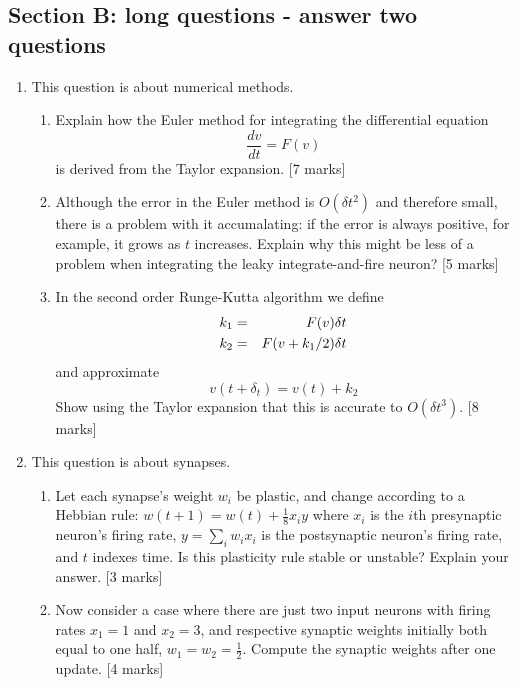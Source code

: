\documentclass[a4paper,12pt]{article}
\newif\ifsoln
\begin{document}
\subsection*{Section B: long questions - answer two questions}

\begin{enumerate}


\item This question is about numerical methods. 
\begin{enumerate}
\item Explain how the Euler method for integrating the differential equation 
$$\frac{dv}{dt}=F(v)$$
is derived from the Taylor expansion. [7 marks]
\item Although the error in the Euler method is $O(\delta t^2)$ and
  therefore small, there is a problem with it accumalating: if the
  error is always positive, for example, it grows as $t$
  increases. Explain why this might be less of a problem when
  integrating the leaky integrate-and-fire neuron? [5 marks]
\item In the second order Runge-Kutta algorithm we define
\begin{eqnarray*}
k_1&=&F(v)\delta t\cr
k_2&=&F(v+k_1/2)\delta t
\end{eqnarray*}
and approximate
$$
v(t+\delta_t)=v(t)+k_2
$$
Show using the Taylor expansion that this is accurate to $O(\delta t^3)$. [8 marks]
\end{enumerate}

\ifsoln Solution:  a) and c) see notes; b) because of the reset. \fi

 
\item This question is about synapses.

\begin{enumerate}

\item Let each synapse's weight $w_i$ be plastic, and change according to a Hebbian rule: $w(t+1) = w(t) + \frac{1}{8} x_i y$ where $x_i$ is the $i$th presynaptic neuron's firing rate, $y= \sum_i w_i x_i$ is the postsynaptic neuron's firing rate, and $t$ indexes time. Is this plasticity rule stable or unstable? Explain your answer. [3 marks]

 

\item Now consider a case where there are just two input neurons with firing rates $x_1 = 1$ and $x_2 = 3$, and respective synaptic weights initially both equal to one half, $w_1 = w_2 = \frac{1}{2}$. Compute the synaptic weights after one update. [4 marks]


\end{enumerate}
\end{enumerate}
\end{document}
